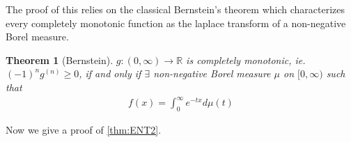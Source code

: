 \documentclass[10pt]{article}
\newcommand{\1}{\textbf{1}}
\newcommand{\R}{\mathbb{R}}
\newtheorem{theorem}{Theorem}[subsection]
\theoremstyle{remark}
\theoremstyle{definition}
\begin{document}
The proof of this relies on the classical Bernstein's theorem which characterizes every completely monotonic function as the laplace transform of a non-negative Borel measure.

\begin{theorem}[Bernstein]\label{thm:BERNSTEIN}
	$g : (0,\infty) \to \R$ is completely monotonic, ie. $(-1)^ng^{(n)} \geq 0$, if and only if $\exists$ non-negative Borel measure $\mu$ on $[0,\infty)$ such that
	\begin{align*}
		f(x) = \int_0^{\infty} e^{-tx}d\mu(t)
	\end{align*}
\end{theorem}


Now we give a proof of \ref{thm:ENT2}.
\end{document}
